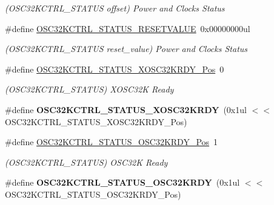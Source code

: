 \begin{DoxyCompactItemize}
\begin{DoxyCompactList}\small\item\em (O\+S\+C32\+K\+C\+T\+R\+L\+\_\+\+S\+T\+A\+T\+U\+S offset) Power and Clocks Status \end{DoxyCompactList}\item 
\hypertarget{group___s_a_m_l21___o_s_c32_k_c_t_r_l_ga9e2afc754dc43d2728983182cadff4f1}{}\#define \hyperlink{group___s_a_m_l21___o_s_c32_k_c_t_r_l_ga9e2afc754dc43d2728983182cadff4f1}{O\+S\+C32\+K\+C\+T\+R\+L\+\_\+\+S\+T\+A\+T\+U\+S\+\_\+\+R\+E\+S\+E\+T\+V\+A\+L\+U\+E}~0x00000000ul\label{group___s_a_m_l21___o_s_c32_k_c_t_r_l_ga9e2afc754dc43d2728983182cadff4f1}

\begin{DoxyCompactList}\small\item\em (O\+S\+C32\+K\+C\+T\+R\+L\+\_\+\+S\+T\+A\+T\+U\+S reset\+\_\+value) Power and Clocks Status \end{DoxyCompactList}\item 
\hypertarget{group___s_a_m_l21___o_s_c32_k_c_t_r_l_gaa403dd126839f064ae0c834d2bd63477}{}\#define \hyperlink{group___s_a_m_l21___o_s_c32_k_c_t_r_l_gaa403dd126839f064ae0c834d2bd63477}{O\+S\+C32\+K\+C\+T\+R\+L\+\_\+\+S\+T\+A\+T\+U\+S\+\_\+\+X\+O\+S\+C32\+K\+R\+D\+Y\+\_\+\+Pos}~0\label{group___s_a_m_l21___o_s_c32_k_c_t_r_l_gaa403dd126839f064ae0c834d2bd63477}

\begin{DoxyCompactList}\small\item\em (O\+S\+C32\+K\+C\+T\+R\+L\+\_\+\+S\+T\+A\+T\+U\+S) X\+O\+S\+C32\+K Ready \end{DoxyCompactList}\item 
\hypertarget{group___s_a_m_l21___o_s_c32_k_c_t_r_l_gafc8fd494fedc012db5a796e6946346b8}{}\#define {\bfseries O\+S\+C32\+K\+C\+T\+R\+L\+\_\+\+S\+T\+A\+T\+U\+S\+\_\+\+X\+O\+S\+C32\+K\+R\+D\+Y}~(0x1ul $<$$<$ O\+S\+C32\+K\+C\+T\+R\+L\+\_\+\+S\+T\+A\+T\+U\+S\+\_\+\+X\+O\+S\+C32\+K\+R\+D\+Y\+\_\+\+Pos)\label{group___s_a_m_l21___o_s_c32_k_c_t_r_l_gafc8fd494fedc012db5a796e6946346b8}

\item 
\hypertarget{group___s_a_m_l21___o_s_c32_k_c_t_r_l_ga6bf6b49a68645a274b38374b4c90a2c8}{}\#define \hyperlink{group___s_a_m_l21___o_s_c32_k_c_t_r_l_ga6bf6b49a68645a274b38374b4c90a2c8}{O\+S\+C32\+K\+C\+T\+R\+L\+\_\+\+S\+T\+A\+T\+U\+S\+\_\+\+O\+S\+C32\+K\+R\+D\+Y\+\_\+\+Pos}~1\label{group___s_a_m_l21___o_s_c32_k_c_t_r_l_ga6bf6b49a68645a274b38374b4c90a2c8}

\begin{DoxyCompactList}\small\item\em (O\+S\+C32\+K\+C\+T\+R\+L\+\_\+\+S\+T\+A\+T\+U\+S) O\+S\+C32\+K Ready \end{DoxyCompactList}\item 
\hypertarget{group___s_a_m_l21___o_s_c32_k_c_t_r_l_ga4d403d49a586837bb595933baea43f9d}{}\#define {\bfseries O\+S\+C32\+K\+C\+T\+R\+L\+\_\+\+S\+T\+A\+T\+U\+S\+\_\+\+O\+S\+C32\+K\+R\+D\+Y}~(0x1ul $<$$<$ O\+S\+C32\+K\+C\+T\+R\+L\+\_\+\+S\+T\+A\+T\+U\+S\+\_\+\+O\+S\+C32\+K\+R\+D\+Y\+\_\+\+Pos)\label{group___s_a_m_l21___o_s_c32_k_c_t_r_l_ga4d403d49a586837bb595933baea43f9d}


\end{DoxyCompactItemize}
